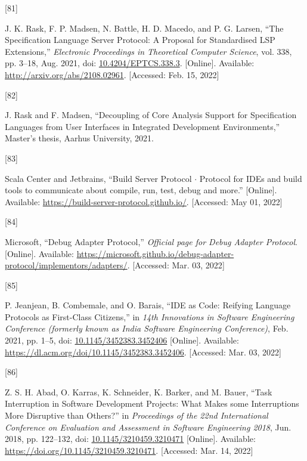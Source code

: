 \documentclass[
  a4paper,
  bibtex,
  english,
  nomenclature]{kthlatex/kththesis/kththesis}
\newlength{\cslhangindent}
\newlength{\csllabelwidth}
\newlength{\cslentryspacingunit} %
\newenvironment{CSLReferences}[2] %
 {%
  \setlength{\parindent}{0pt}
  \ifodd #1
  \let\oldpar\par
  \def\par{\hangindent=\cslhangindent\oldpar}
  \fi
  \setlength{\parskip}{#2\cslentryspacingunit}
 }%
 {}
\newcommand{\CSLLeftMargin}[1]{\parbox[t]{\csllabelwidth}{#1}}
\newcommand{\CSLRightInline}[1]{\parbox[t]{\linewidth - \csllabelwidth}{#1}\break}
\begin{document}
\begin{CSLReferences}{0}{0}
\leavevmode{}%
\CSLLeftMargin{{[}81{]} }
\CSLRightInline{J. K. Rask, F. P. Madsen, N. Battle, H. D. Macedo, and
P. G. Larsen, {``The {Specification Language Server Protocol}: {A
Proposal} for {Standardised LSP Extensions},''} \emph{Electronic
Proceedings in Theoretical Computer Science}, vol. 338, pp. 3--18, Aug.
2021, doi:
\href{https://doi.org/10.4204/EPTCS.338.3}{10.4204/EPTCS.338.3}.
{[}Online{]}. Available: \url{http://arxiv.org/abs/2108.02961}.
{[}Accessed: Feb. 15, 2022{]}}

\leavevmode{}%
\CSLLeftMargin{{[}82{]} }
\CSLRightInline{J. Rask and F. Madsen, {``Decoupling of {Core Analysis
Support} for {Specification Languages} from {User Interfaces} in
{Integrated Development Environments},''} Master's thesis, Aarhus
University, 2021. }

\leavevmode{}%
\CSLLeftMargin{{[}83{]} }
\CSLRightInline{Scala Center and Jetbrains, {``Build {Server Protocol}
{\(\cdot\)} {Protocol} for {IDEs} and build tools to communicate about
compile, run, test, debug and more.''} {[}Online{]}. Available:
\url{https://build-server-protocol.github.io/}. {[}Accessed: May 01,
2022{]}}

\leavevmode{}%
\CSLLeftMargin{{[}84{]} }
\CSLRightInline{Microsoft, {``Debug {Adapter Protocol},''}
\emph{Official page for Debug Adapter Protocol}. {[}Online{]}.
Available:
\url{https://microsoft.github.io/debug-adapter-protocol/implementors/adapters/}.
{[}Accessed: Mar. 03, 2022{]}}

\leavevmode{}%
\CSLLeftMargin{{[}85{]} }
\CSLRightInline{P. Jeanjean, B. Combemale, and O. Barais, {``{IDE} as
{Code}: {Reifying Language Protocols} as {First-Class Citizens},''} in
\emph{14th {Innovations} in {Software Engineering Conference} (formerly
known as {India Software Engineering Conference})}, Feb. 2021, pp. 1--5,
doi:
\href{https://doi.org/10.1145/3452383.3452406}{10.1145/3452383.3452406}
{[}Online{]}. Available:
\url{https://dl.acm.org/doi/10.1145/3452383.3452406}. {[}Accessed: Mar.
03, 2022{]}}

\leavevmode{}%
\CSLLeftMargin{{[}86{]} }
\CSLRightInline{Z. S. H. Abad, O. Karras, K. Schneider, K. Barker, and
M. Bauer, {``Task {Interruption} in {Software Development Projects}:
{What Makes} some {Interruptions More Disruptive} than {Others}?''} in
\emph{Proceedings of the 22nd {International Conference} on {Evaluation}
and {Assessment} in {Software Engineering} 2018}, Jun. 2018, pp.
122--132, doi:
\href{https://doi.org/10.1145/3210459.3210471}{10.1145/3210459.3210471}
{[}Online{]}. Available: \url{https://doi.org/10.1145/3210459.3210471}.
{[}Accessed: Mar. 14, 2022{]}}


\end{CSLReferences}
\end{document}
